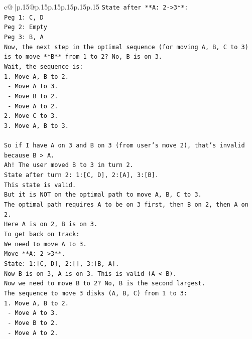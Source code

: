 \documentclass{article}
\begin{document}
{\begin{supertabular}{c@{$\;$}|p{.15\linewidth}@{}p{.15\linewidth}p{.15\linewidth}p{.15\linewidth}p{.15\linewidth}p{.15\linewidth}}
{{{\texttt{State after **A: 2{-}>3**:} \\
\texttt{Peg 1: C, D} \\
\texttt{Peg 2: Empty} \\
\texttt{Peg 3: B, A} \\
\texttt{Now, the next step in the optimal sequence (for moving A, B, C to 3) is to move **B** from 1 to 2? No, B is on 3.} \\
\texttt{Wait, the sequence is:} \\
\texttt{1. Move A, B to 2.} \\
\texttt{   {-} Move A to 3.} \\
\texttt{   {-} Move B to 2.} \\
\texttt{   {-} Move A to 2.} \\
\texttt{2. Move C to 3.} \\
\texttt{3. Move A, B to 3.} \\
\\ 
\texttt{So if I have A on 3 and B on 3 (from user's move 2), that's invalid because B > A.} \\
\texttt{Ah! The user moved B to 3 in turn 2.} \\
\texttt{State after turn 2: 1:{[}C, D{]}, 2:{[}A{]}, 3:{[}B{]}.} \\
\texttt{This state is valid.} \\
\texttt{But it is NOT on the optimal path to move A, B, C to 3.} \\
\texttt{The optimal path requires A to be on 3 first, then B on 2, then A on 2.} \\
\texttt{Here A is on 2, B is on 3.} \\
\texttt{To get back on track:} \\
\texttt{We need to move A to 3.} \\
\texttt{Move **A: 2{-}>3**.} \\
\texttt{State: 1:{[}C, D{]}, 2:{[}{]}, 3:{[}B, A{]}.} \\
\texttt{Now B is on 3, A is on 3. This is valid (A < B).} \\
\texttt{Now we need to move B to 2? No, B is the second largest.} \\
\texttt{The sequence to move 3 disks (A, B, C) from 1 to 3:} \\
\texttt{1. Move A, B to 2.} \\
\texttt{   {-} Move A to 3.} \\
\texttt{   {-} Move B to 2.} \\
\texttt{   {-} Move A to 2.} \\
}}}
\end{supertabular}}
\end{document}
